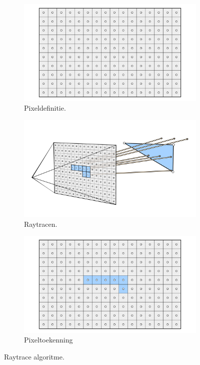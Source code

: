 \begin{figure}
  \centering
  \begin{subfigure}[b]{0.33\textwidth}
    \includegraphics[width=\textwidth]{./img/raw/rt-raytracing/raytrace1.png}
    \caption{Pixeldefinitie.}
    \label{fig:rt-raytracing:1}
  \end{subfigure}%
  \begin{subfigure}[b]{0.33\textwidth}
    \includegraphics[width=\textwidth]{./img/raw/rt-raytracing/raytrace2.png}
    \caption{Raytracen.}
    \label{fig:rt-raytracing:2}
  \end{subfigure}%
  \begin{subfigure}[b]{0.33\textwidth}
    \includegraphics[width=\textwidth]{./img/raw/rt-raytracing/raytrace3.png}
    \caption{Pixeltoekenning}
    \label{fig:rt-raytracing:3}
  \end{subfigure}%
  \caption{Raytrace algoritme.}
  \label{fig:rt-raytracing}
\end{figure}
